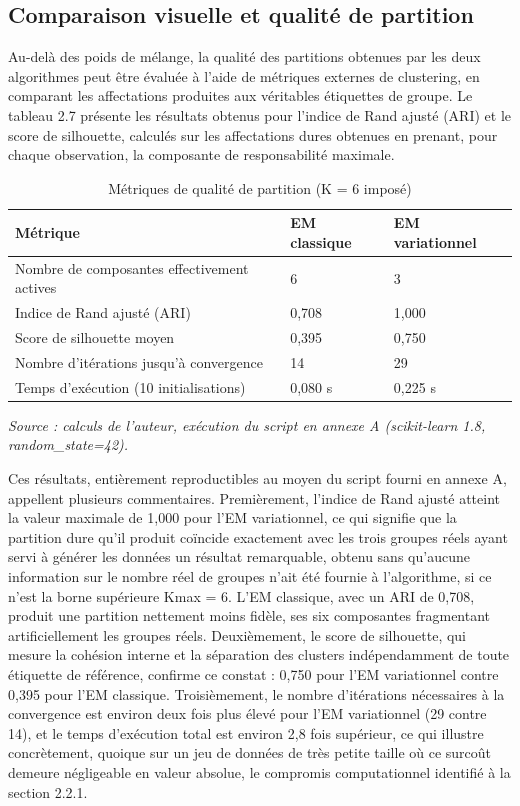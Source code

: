 \subsection{Comparaison visuelle et qualité de partition}
Au-delà des poids de mélange, la qualité des partitions obtenues par les deux algorithmes peut être évaluée à l'aide de métriques externes de clustering, en comparant les affectations produites aux véritables étiquettes de groupe. Le tableau 2.7 présente les résultats obtenus pour l'indice de Rand ajusté (ARI) et le score de silhouette, calculés sur les affectations dures obtenues en prenant, pour chaque observation, la composante de responsabilité maximale.

\begin{table}[H]
\centering
\small
\setlength{\tabcolsep}{0.14cm}
\begin{tabular}{|p{4.84cm}|p{4.84cm}|p{4.84cm}|}
\hline
\textbf{Métrique} & \textbf{EM classique} & \textbf{EM variationnel} \\
\hline
Nombre de composantes effectivement actives & 6 & 3 \\
\hline
Indice de Rand ajusté (ARI) & 0,708 & 1,000 \\
\hline
Score de silhouette moyen & 0,395 & 0,750 \\
\hline
Nombre d'itérations jusqu'à convergence & 14 & 29 \\
\hline
Temps d'exécution (10 initialisations) & 0,080 s & 0,225 s \\
\hline
\end{tabular}
\caption{Métriques de qualité de partition (K = 6 imposé)}
\label{tab:2_7}
\end{table}
\emph{Source : calculs de l'auteur, exécution du script en annexe A (scikit-learn 1.8, random\_state=42).}

Ces résultats, entièrement reproductibles au moyen du script fourni en annexe A, appellent plusieurs commentaires. Premièrement, l'indice de Rand ajusté atteint la valeur maximale de 1,000 pour l'EM variationnel, ce qui signifie que la partition dure qu'il produit coïncide exactement avec les trois groupes réels ayant servi à générer les données  un résultat remarquable, obtenu sans qu'aucune information sur le nombre réel de groupes n'ait été fournie à l'algorithme, si ce n'est la borne supérieure Kmax = 6. L'EM classique, avec un ARI de 0,708, produit une partition nettement moins fidèle, ses six composantes fragmentant artificiellement les groupes réels. Deuxièmement, le score de silhouette, qui mesure la cohésion interne et la séparation des clusters indépendamment de toute étiquette de référence, confirme ce constat : 0,750 pour l'EM variationnel contre 0,395 pour l'EM classique. Troisièmement, le nombre d'itérations nécessaires à la convergence est environ deux fois plus élevé pour l'EM variationnel (29 contre 14), et le temps d'exécution total est environ 2,8 fois supérieur, ce qui illustre concrètement, quoique sur un jeu de données de très petite taille où ce surcoût demeure négligeable en valeur absolue, le compromis computationnel identifié à la section 2.2.1.

